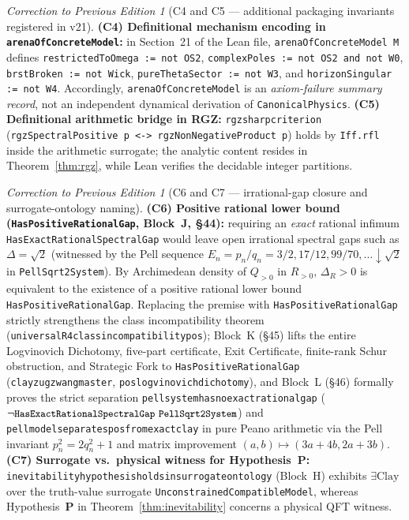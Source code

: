 \documentclass[11pt,a4paper]{article}
\def\R{R}\def\N{N}\def\Q{Q}\def\Z{Z}\def\Class{C}\def\OS{OS}\def\Gap{Gap}%
\theoremstyle{plain}
\theoremstyle{definition}
\theoremstyle{remark}
\newtheorem{correction}[theorem]{Correction to Previous Edition}
\newcommand{\R}{\mathbb{R}}\newcommand{\N}{\mathbb{N}}\newcommand{\Q}{\mathbb{Q}}
\newcommand{\Z}{\mathbb{Z}}\newcommand{\Spec}{\operatorname{Spec}}
\newcommand{\OS}{\mathrm{OS}}\newcommand{\Gap}{\mathrm{Gap}}
\newcommand{\Class}{\mathcal{C}}\newcommand{\Htot}{\mathcal{H}}
\renewcommand{\_}{\oldunderscore\allowbreak}
\newcommand{\Lean}[1]{\texttt{\small #1}}
\begin{document}
\begin{correction}[C4 and C5 --- additional packaging invariants registered in v21]\label{corr:C4C5}
\textbf{(C4) Definitional mechanism encoding in \Lean{arenaOfConcreteModel}:}
in Section~21 of the Lean file, \Lean{arenaOfConcreteModel M} defines
\Lean{restrictedToOmega := not OS2}, \Lean{complexPoles := not OS2 and not W0},
\Lean{brstBroken := not Wick}, \Lean{pureThetaSector := not W3}, and
\Lean{horizonSingular := not W4}. Accordingly, \Lean{arenaOfConcreteModel} is an
\emph{axiom-failure summary record}, not an independent dynamical derivation of
\Lean{CanonicalPhysics}.
\textbf{(C5) Definitional arithmetic bridge in RGZ:}
\Lean{rgz\_sharp\_criterion} (\Lean{rgzSpectralPositive p <-> rgzNonNegativeProduct p})
holds by \Lean{Iff.rfl} inside the arithmetic surrogate; the analytic content resides in
Theorem~\ref{thm:rgz}, while Lean verifies the decidable integer partitions.
\end{correction}
\begin{correction}[C6 and C7 --- irrational-gap closure and surrogate-ontology naming]\label{corr:C6C7}
\textbf{(C6) Positive rational lower bound (\Lean{HasPositiveRationalGap}, Block~J, \S44):}
requiring an \emph{exact} rational infimum \Lean{HasExactRationalSpectralGap} would leave open irrational spectral gaps such as $\Delta = \sqrt{2}$ (witnessed by the Pell sequence $E_n = p_n/q_n = 3/2, 17/12, 99/70, \dots \downarrow \sqrt{2}$ in \Lean{PellSqrt2System}). By Archimedean density of $\Q_{>0}$ in $\R_{>0}$, $\Delta_\R > 0$ is equivalent to the existence of a positive rational lower bound \Lean{HasPositiveRationalGap}. Replacing the premise with \Lean{HasPositiveRationalGap} strictly strengthens the class incompatibility theorem (\Lean{universal\_R4\_class\_incompatibility\_pos}); Block~K (\S45) lifts the entire Logvinovich Dichotomy, five-part certificate, Exit Certificate, finite-rank Schur obstruction, and Strategic Fork to \Lean{HasPositiveRationalGap} (\Lean{clay\_zugzwang\_master}, \Lean{pos\_logvinovich\_dichotomy}), and Block~L (\S46) formally proves the strict separation \Lean{pell\_system\_has\_no\_exact\_rational\_gap} ($\neg\Lean{HasExactRationalSpectralGap}\ \Lean{PellSqrt2System}$) and \Lean{pell\_model\_separates\_pos\_from\_exact\_clay} in pure Peano arithmetic via the Pell invariant $p_n^2=2q_n^2+1$ and matrix improvement $(a,b)\mapsto(3a+4b,2a+3b)$.
\textbf{(C7) Surrogate vs.\ physical witness for Hypothesis~\textbf{P}:}
\Lean{inevitability\_hypothesis\_holds\_in\_surrogate\_ontology} (Block~H) exhibits $\exists\mathrm{Clay}$ over the truth-value surrogate \Lean{UnconstrainedCompatibleModel}, whereas Hypothesis~\textbf{P} in Theorem~\ref{thm:inevitability} concerns a physical QFT witness.
\end{correction}
\end{document}
